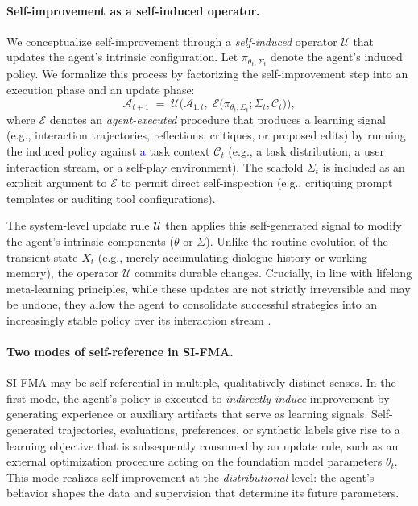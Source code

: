 \paragraph{Self-improvement as a self-induced operator.}
We conceptualize self-improvement through a \emph{self-induced} operator $\mathcal{U}$ that updates the agent’s intrinsic configuration. Let $\pi_{\theta_t,\Sigma_t}$ denote the agent’s induced policy. We formalize this process by factorizing the self-improvement step into an execution phase and an update phase:
\begin{equation}
\mathcal{A}_{t+1} \;=\; \mathcal{U}\Big(\mathcal{A}_{1:t},\; \mathcal{E}\big(\pi_{\theta_{t},\Sigma_{t}};\Sigma_{t},\mathcal{C}_{t}\big)\Big),
\end{equation}
where $\mathcal{E}$ denotes an \emph{agent-executed} procedure that produces a learning signal (e.g., interaction trajectories, reflections, critiques, or proposed edits) by running the induced policy against \textcolor{blue}{a} task context $\mathcal{C}_t$ (e.g., a task distribution, a user interaction stream, or a self-play environment). The scaffold $\Sigma_t$ is included as an explicit argument to $\mathcal{E}$ to permit direct self-inspection (e.g., critiquing prompt templates or auditing tool configurations). 

The system-level update rule $\mathcal{U}$ then applies this self-generated signal to modify the agent's intrinsic components ($\theta$ or $\Sigma$). Unlike the routine evolution of the transient state $X_t$ (e.g., merely accumulating dialogue history or working memory), the operator $\mathcal{U}$ commits durable changes. Crucially, in line with lifelong meta-learning principles, while these updates are not strictly irreversible and may be undone, they allow the agent to consolidate successful strategies into an increasingly stable policy over its interaction stream \citep{Schmidhuber1994OnLH, schmidhuber1995beyond, DBLP:conf/icml/WieringS96, schmidhuber1996simple}.


\paragraph{Two modes of self-reference in SI-FMA.}
SI-FMA may be self-referential in multiple, qualitatively distinct senses. In the first mode, the agent’s policy is executed to \emph{indirectly induce} improvement by generating experience or auxiliary artifacts that serve as learning signals. Self-generated trajectories, evaluations, preferences, or synthetic labels give rise to a learning objective that is subsequently consumed by an update rule, such as an external optimization procedure acting on the foundation model parameters $\theta_t$. This mode realizes self-improvement at the \emph{distributional} level: the agent’s behavior shapes the data and supervision that determine its future parameters.

